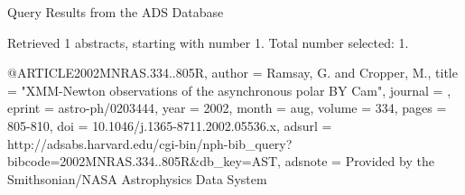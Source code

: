 Query Results from the ADS Database


Retrieved 1 abstracts, starting with number 1.  Total number selected: 1.

@ARTICLE{2002MNRAS.334..805R,
   author = {{Ramsay}, G. and {Cropper}, M.},
    title = "{XMM-Newton observations of the asynchronous polar BY Cam}",
  journal = {\mnras},
   eprint = {astro-ph/0203444},
     year = 2002,
    month = aug,
   volume = 334,
    pages = {805-810},
      doi = {10.1046/j.1365-8711.2002.05536.x},
   adsurl = {http://adsabs.harvard.edu/cgi-bin/nph-bib_query?bibcode=2002MNRAS.334..805R&db_key=AST},
  adsnote = {Provided by the Smithsonian/NASA Astrophysics Data System}
}


